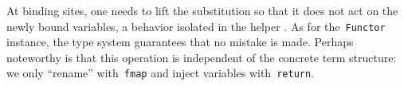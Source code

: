 \documentclass[9pt,preprint,authoryear]{sigplanconf}
\begin{document}
%
At binding sites, one needs to lift the substitution so that it does not
    act on the newly bound variables, a behavior isolated in the helper \textcolor[rgb]{0,0,0.80}{\texttt{\makebox[1.22ex][c]{\textgreater{}}\makebox[1.22ex][c]{\textgreater{}}}}. As for the{~}\textcolor[rgb]{0,0,0.80}{\texttt{Functor}} instance,
    the type system guarantees that no mistake is made. Perhaps
    noteworthy is that this operation is independent of the concrete
    term structure{:} we only {``}rename{''} with{~}\textcolor[rgb]{0,0,0.80}{\texttt{fmap}} and inject variables
    with{~}\textcolor[rgb]{0,0,0.80}{\texttt{return}}.%


{\nopagebreak }

%
%
%
\end{document}
